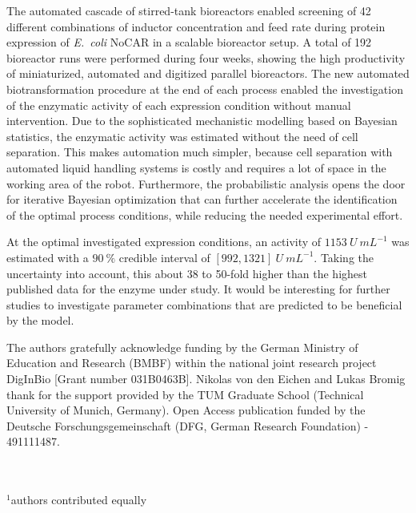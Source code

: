 \documentclass[sn-standardnature]{sn-jnl}%
\theoremstyle{thmstyleone}%
\theoremstyle{thmstyletwo}%
\theoremstyle{thmstylethree}%
\begin{document}
The automated cascade of stirred-tank bioreactors enabled screening of 42 different combinations of inductor concentration and feed rate during protein expression of \textit{E.~coli} NoCAR in a scalable bioreactor setup.
A total of 192 bioreactor runs were performed during four weeks, showing the high productivity of miniaturized, automated and digitized parallel bioreactors.
The new automated biotransformation procedure at the end of each process enabled the investigation of the enzymatic activity of each expression condition without manual intervention.
Due to the sophisticated mechanistic modelling based on Bayesian statistics, the enzymatic activity was estimated without the need of cell separation.
This makes automation much simpler, because cell separation with automated liquid handling systems is costly and requires a lot of space in the working area of the robot.
Furthermore, the probabilistic analysis opens the door for iterative Bayesian optimization that can further accelerate the identification of the optimal process conditions, while reducing the needed experimental effort.

At the optimal investigated expression conditions, an activity of $1153\ U\ mL^{-1}$ was estimated with a $90\ \%$ credible interval of $[992, 1321]\ U\ mL^{-1}$.
Taking the uncertainty into account, this about 38 to 50-fold higher than the highest published data for the enzyme under study.
It would be interesting for further studies to investigate parameter combinations that are predicted to be beneficial by the model.

\backmatter
{}
The authors gratefully acknowledge funding by the German Ministry of Education and Research (BMBF) within the national joint research project DigInBio [Grant number 031B0463B].
Nikolas von den Eichen and Lukas Bromig thank for the support provided by the TUM Graduate School (Technical University of Munich, Germany).
Open Access publication funded by the Deutsche Forschungsgemeinschaft (DFG, German Research Foundation) - 491111487.




\mbox{}\\
\mbox{}\\
$^1$authors contributed equally
\end{document}
